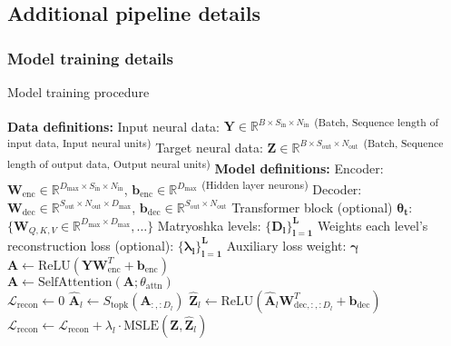 \subsection{Additional pipeline details}
\label{subsection:additional_pipeline_details}

\subsubsection{Model training details}
\label{subsubsection:model_training_details}

\begin{algorithm}[h!]
\caption{Model training procedure}
\label{algorithm:sdnn_model_training}
\begin{algorithmic}[1]
\State \textbf{Data definitions:}
\State \quad Input neural data: $\mathbf{Y} \in \mathbb{R}^{B \times S_{\text{in}} \times N_{\text{in}}}$ \textsuperscript{(Batch, Sequence length of input data, Input neural units)}
\State \quad Target neural data: $\mathbf{Z} \in \mathbb{R}^{B \times S_{\text{out}} \times N_{\text{out}}}$ \textsuperscript{(Batch, Sequence length of output data, Output neural units)}
\State \textbf{Model definitions:}
\State \quad Encoder: $\mathbf{W}_{\text{enc}} \in \mathbb{R}^{D_{\text{max}} \times S_{\text{in}} \times N_{\text{in}}}$, $\mathbf{b}_{\text{enc}} \in \mathbb{R}^{D_{\text{max}}}$ \textsuperscript{(Hidden layer neurons)}
\State \quad Decoder: $\mathbf{W}_{\text{dec}} \in \mathbb{R}^{S_{\text{out}} \times N_{\text{out}} \times D_{\text{max}}}$, $\mathbf{b}_{\text{dec}} \in \mathbb{R}^{S_{\text{out}} \times N_{\text{out}}}$
\State \quad Transformer block (optional) $\mathbf{\theta_{t}}$: $\{\mathbf{W}_{Q,K,V} \in \mathbb{R}^{D_{\max} \times D_{\max}}, \dots\}$
\State \quad Matryoshka levels: $\mathbf{\{D_l\}_{l=1}^L}$
\State \quad Weights each level's reconstruction loss (optional): $\mathbf{\{\lambda_l\}_{l=1}^L}$
\State \quad Auxiliary loss weight: $\mathbf{\gamma}$
\\
    \Statex {}
    \State $\mathbf{A} \gets \text{ReLU}(\mathbf{Y}\mathbf{W}_{\text{enc}}^T + \mathbf{b}_{\text{enc}})$ 
    \\
        \State $\mathbf{A} \gets \text{SelfAttention}(\mathbf{A}; \theta_{\text{attn}})$ 
    \EndIf
    \\
    \State $\mathcal{L}_{\text{recon}} \gets 0$
     
        \State $\hat{\mathbf{A}}_l \gets S_{\text{topk}}(\mathbf{A}_{:, :D_l})$ 
        \State $\hat{\mathbf{Z}}_l \gets \text{ReLU}(\hat{\mathbf{A}}_l \mathbf{W}_{\text{dec}, :, :D_l}^T + \mathbf{b}_{\text{dec}})$ 
        \State $\mathcal{L}_{\text{recon}} \gets \mathcal{L}_{\text{recon}} + \lambda_l \cdot \text{MSLE}(\mathbf{Z}, \hat{\mathbf{Z}}_l)$ 
    \EndFor
    

\end{algorithmic}
\end{algorithm}
